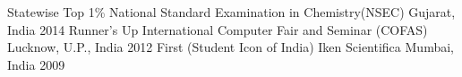 \begin{cvhonors}
  \cvhonor
    {Statewise Top 1\%}
    {National Standard Examination in Chemistry(NSEC)}
    {Gujarat, India}
    {2014}
  \cvhonor
    {Runner's Up}
    {International Computer Fair and Seminar (COFAS)}
    {Lucknow, U.P., India}
    {2012}
  \cvhonor
    {First (Student Icon of India)}
    {Iken Scientifica}
    {Mumbai, India}
    {2009}
\end{cvhonors}



